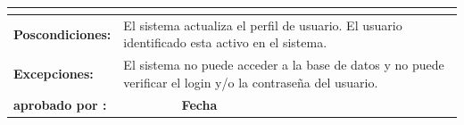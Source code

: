 \begin{center}
\begin{longtable}{|p{3cm}|p{3cm}|p{3cm}|p{3cm}|}
{\begin{itemize}
\end{itemize}}\\
\hline
\bf Poscondiciones: &\multicolumn{3}{|p{9cm}|}{El sistema actualiza el perfil de usuario. El usuario identificado esta activo en el sistema.} \\
\hline
\hline
\bf Excepciones: &\multicolumn{3}{|p{9cm}|}{ El sistema no puede acceder a la base de datos y no puede verificar el login y/o la contraseña del usuario.} \\
\hline
\hline
\bf aprobado por : &   & \bf Fecha &  \\
\hline
\end{longtable}
\end{center}

% 
